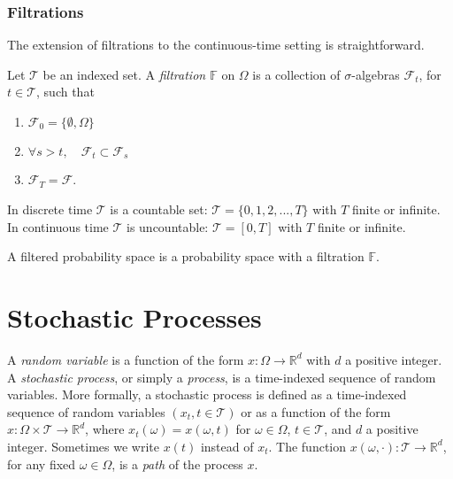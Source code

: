 \documentclass[\topdir/lecture\_notes.tex]{subfiles}
\begin{document}
\subsubsection*{Filtrations}

The extension of filtrations to the continuous-time setting is straightforward.
\begin{defn}\label{defn:filtration}
Let \(\mathcal{T}\) be an indexed set. A \emph{filtration \(\mathbb{F}\)} on \(\Omega\) is a collection of \(\sigma\)-algebras \(\mathcal{F}_{t}\), for \(t \in \mathcal{T}\), such that
\begin{enumerate}
    \item \(\mathcal{F}_{0}=\{\emptyset, \Omega\}\)
    \item \(\forall s>t, \quad \mathcal{F}_{t} \subset \mathcal{F}_{s}\)
    \item \(\mathcal{F}_{T}=\mathcal{F}\).
\end{enumerate}
\end{defn}
In discrete time \(\mathcal{T}\) is a countable set: \(\mathcal{T}=\{0,1,2,..., T\}\) with \(T\) finite or infinite. In continuous time \(\mathcal{T}\) is uncountable: \(\mathcal{T}=[0,T]\) with \(T\) finite or infinite.

\begin{defn}
A filtered probability space is a probability space with a filtration \(\mathbb{F}\). 
\end{defn}


\section{Stochastic Processes}

A \emph{random variable} is a function of the form \(x: \Omega \rightarrow \mathbb{R}^d\) with \(d\) a positive integer. A \emph{stochastic process}, or simply a \emph{process}, is a time-indexed sequence of random variables. More formally, a stochastic process is defined as a time-indexed sequence of random variables \((x_{t}, t\in\mathcal{T})\) or as a function of the form \(x: \Omega \times\mathcal{T} \rightarrow \mathbb{R}^d\), where \(x_{t}(\omega)=x(\omega, t)\) for \(\omega \in \Omega\), \(t \in\mathcal{T}\), and \(d\) a positive integer. Sometimes we write \(x(t)\) instead of \(x_{t}\). The function \(x(\omega, \cdot):\mathcal{T} \rightarrow \mathbb{R}^d\), for any fixed \(\omega \in \Omega\), is a \emph{path} of the process \(x\).
\end{document}
